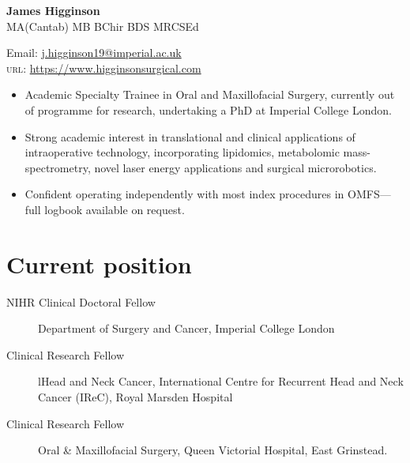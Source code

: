 \documentclass[11pt]{article} %
\begin{document}

{\LARGE\bfseries James Higginson} %
\\{\Large MA(Cantab) MB BChir BDS MRCSEd}
\bigskip\bigskip\medskip %




Email: \href{mailto:j.higginson19@imperial.ac.uk}{j.higginson19@imperial.ac.uk}\\ %
\textsc{url}: \href{https://www.higginsonsurgical.com}{https://www.higginsonsurgical.com}\\ %

\vspace{0.06\textheight} %

\begin{itemize}
\item Academic Specialty Trainee in Oral and Maxillofacial Surgery, currently out of programme for research, undertaking a PhD at Imperial College London. 
\item Strong academic interest in translational and clinical applications of intraoperative technology, incorporating lipidomics, metabolomic mass-spectrometry, novel laser energy applications and surgical microrobotics. 
\item Confident operating independently with most index procedures in OMFS---full logbook available on request.
\end{itemize}

\section*{Current position}

\begin{description}
\item[NIHR Clinical Doctoral Fellow] Department of Surgery and Cancer, Imperial College London%
\item[Clinical Research Fellow]lHead and Neck Cancer, International Centre for Recurrent Head and Neck Cancer (IReC), Royal Marsden Hospital
\item[Clinical Research Fellow] Oral \& Maxillofacial Surgery, Queen Victorial Hospital, East Grinstead.
\end{description}
\end{document}
